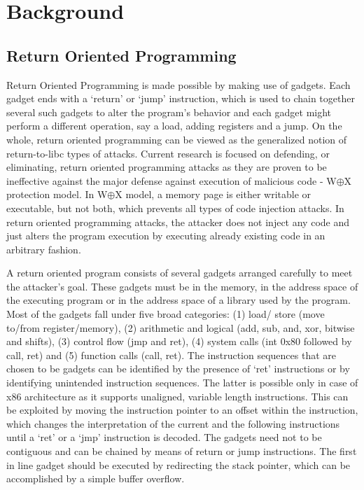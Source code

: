 \section{Background}
\label{sec:background}

\subsection {Return Oriented Programming}
Return Oriented Programming \cite{roemer2012return} is made possible by 
making use of gadgets. Each gadget ends with a `return' or `jump' 
instruction, which is used to chain together several such gadgets to alter 
the program's behavior and each gadget might perform a different operation, 
say a load, adding registers and a jump. On the whole, return oriented 
programming can be viewed as the generalized notion of return-to-libc 
\cite{wojtczuk2001advanced} types of attacks. Current research is focused on 
defending, or eliminating, return oriented programming attacks as they are 
proven \cite{krahmer2005x86} to be ineffective against the major defense 
against execution of malicious code - W$\oplus$X protection model. In 
W$\oplus$X model, a memory page is either writable or executable, but not 
both, which prevents all types of code injection attacks. In return oriented 
programming attacks, the attacker does not inject any code and just alters the 
program execution by executing already existing code in an arbitrary fashion.

A return oriented program consists of several gadgets arranged carefully to 
meet the attacker's goal. These gadgets must be in the memory, in the address 
space of the executing program or in the address space of a library used by 
the program. Most of the gadgets fall under five broad categories: (1) load/
store (move to/from register/memory), (2) arithmetic and logical (add, sub, 
and, xor, bitwise and shifts), (3) control flow (jmp and ret), (4) system 
calls (int 0x80 followed by call, ret) and (5) function calls (call, ret). The 
instruction sequences that are chosen to be gadgets can be identified by the 
presence of `ret' instructions or by identifying unintended instruction 
sequences. The latter is possible only in case of x86 architecture as it 
supports unaligned, variable length instructions. This can be exploited by 
moving the instruction pointer to an offset within the instruction, which 
changes the interpretation of the current and the following instructions until 
a `ret' or a `jmp' instruction is decoded. The gadgets need not to be 
contiguous and can be chained by means of return or jump instructions. The 
first in line gadget should be executed by redirecting the stack pointer, 
which can be accomplished by a simple buffer overflow.


